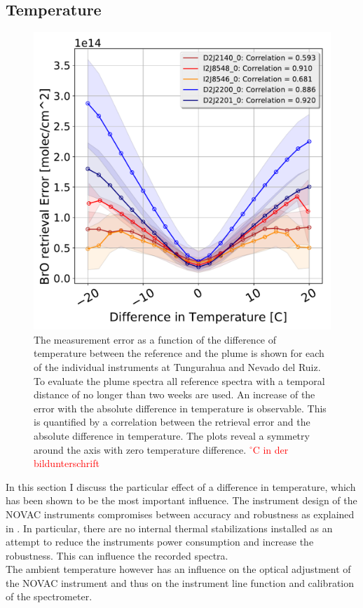 \subsection{Temperature}
\begin{figure}
	\centering
	\includegraphics[width=0.7\linewidth]{Bilder/DiffTempallInstruments}
	\caption{The  measurement error as a function of the difference of temperature between the reference and the plume is shown for each of the individual instruments at Tungurahua and Nevado del Ruiz. To evaluate the plume spectra all reference spectra with a temporal distance of no longer than two weeks are used. An increase of the  error with the absolute difference in temperature is observable. This is quantified by a correlation between the  retrieval error and the absolute difference in temperature. The plots reveal a symmetry around the axis with zero temperature difference. \textcolor{red}{$^{\circ}$C in der bildunterschrift}}
	\label{fig:difftemp}
\end{figure}
In this section I discuss the particular effect of a difference in temperature, which has been shown to be the most important influence.
The instrument design of the NOVAC instruments compromises between accuracy and robustness as explained in . In particular, there are no internal thermal stabilizations installed as an attempt to reduce the instruments power consumption and increase the robustness. This can influence the recorded spectra.\\
The ambient temperature however has an influence on the optical adjustment of the NOVAC instrument and thus on the instrument line function and calibration of the spectrometer.
